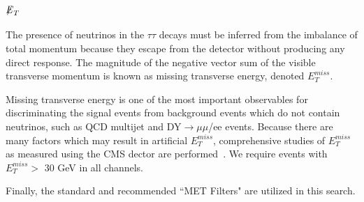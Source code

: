 \subsection{\texorpdfstring{${\not\mathrel{E}}_T$}{Missing transverse energy}}\label{ss:met}

The presence of neutrinos in the $\tau\tau$ decays must be inferred from the imbalance of total momentum because they escape from the detector without producing 
any direct response. The magnitude of the negative vector sum of the visible transverse momentum is known as missing transverse energy, denoted $E^{miss}_{T}$.

Missing transverse energy is one of the most important observables for discriminating the signal events from background events which do not contain neutrinos, 
such as QCD multijet and DY$\to\mu\mu$/ee events.
Because there are many factors which may result in artificial $E^{miss}_{T}$, comprehensive studies of $E^{miss}_{T}$ as measured using the CMS dector are 
performed~\cite{MET}. We require events with $E^{miss}_{T} >$ 30 GeV in all channels.

Finally, the standard and recommended ``MET Filters" are utilized in this search.
